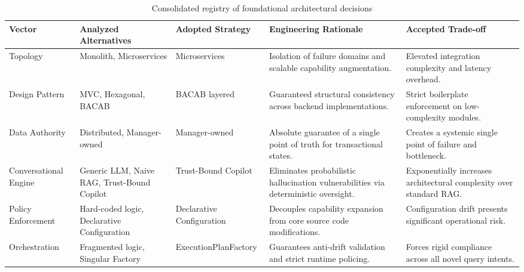 \begin{table}[H]
\centering
\scriptsize
\renewcommand{\arraystretch}{1.3}
\begin{tabularx}{\textwidth}{|p{2.0cm}|p{2.8cm}|p{2.8cm}|>{\RaggedRight\arraybackslash}X|>{\RaggedRight\arraybackslash}X|}
\hline
\rowcolor{lightgray}
\textbf{Vector} & \textbf{Analyzed Alternatives} & \textbf{Adopted Strategy} & \textbf{Engineering Rationale} & \textbf{Accepted Trade-off} \\ \hline
Topology & Monolith, Microservices & Microservices & Isolation of failure domains and scalable capability augmentation. & Elevated integration complexity and latency overhead. \\ \hline
Design Pattern & MVC, Hexagonal, BACAB & BACAB layered & Guaranteed structural consistency across backend implementations. & Strict boilerplate enforcement on low-complexity modules. \\ \hline
Data Authority & Distributed, Manager-owned & Manager-owned & Absolute guarantee of a single point of truth for transactional states. & Creates a systemic single point of failure and bottleneck. \\ \hline
Conversational Engine & Generic LLM, Naive RAG, Trust-Bound Copilot & Trust-Bound Copilot & Eliminates probabilistic hallucination vulnerabilities via deterministic oversight. & Exponentially increases architectural complexity over standard RAG. \\ \hline
Policy Enforcement & Hard-coded logic, Declarative Configuration & Declarative Configuration & Decouples capability expansion from core source code modifications. & Configuration drift presents significant operational risk. \\ \hline
Orchestration & Fragmented logic, Singular Factory & ExecutionPlanFactory & Guarantees anti-drift validation and strict runtime policing. & Forces rigid compliance across all novel query intents. \\ \hline
\end{tabularx}
\caption{Consolidated registry of foundational architectural decisions}
\label{tab:decisions}
\end{table}
